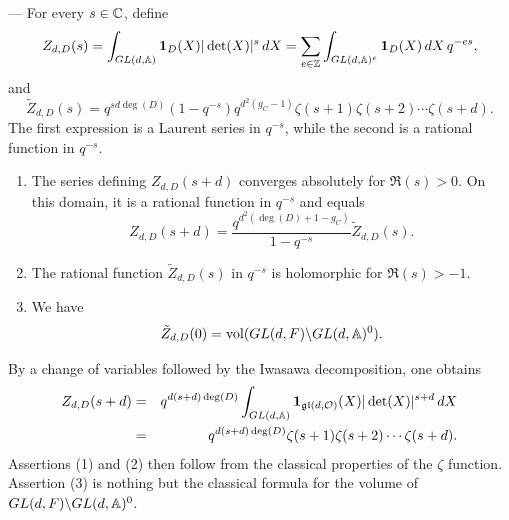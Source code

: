 \begin{paragr} --- For every $s\in \mathbb{C}$, define
$$Z_{d,D}(s)=\int_{GL(d,\mathbb{A})} \mathbf{1}_D(X) |\det(X)|^s\, dX=\sum_{e\in \mathbb{Z}}\int_{GL(d,\mathbb{A})^e} \mathbf{1}_D(X)\, dX \, q^{-es},$$
and
$$\tilde{Z}_{d,D}(s)= q^{sd\deg(D)}(1-q^{-s})q^{d^2(g_C-1)} \zeta(s+1)\zeta(s+2)\cdots \zeta(s+d).$$
The first expression is a Laurent series in $q^{-s}$, while the second is a rational function in $q^{-s}$.

\begin{lemme}\label{lem:zetas}
  \begin{enumerate}
  \item The series defining $Z_{d,D}(s+d)$ converges absolutely for $\Re(s)>0$. On this domain, it is a rational function in $q^{-s}$ and equals
$$ Z_{d,D}(s+d)=\frac{q^{d^2(\deg(D)+1-g_C)}}{1-q^{-s}}\tilde{Z}_{d,D}(s).$$
  \item The rational function $\tilde{Z}_{d,D}(s)$ in $q^{-s}$ is holomorphic for $\Re(s)>-1$.
  \item We have 
$$\tilde{Z}_{d,D}(0)=\operatorname{vol}(GL(d,F)\backslash GL(d,\mathbb{A})^0).$$
  \end{enumerate}
\end{lemme}

\begin{preuve}
By a change of variables followed by the Iwasawa decomposition, one obtains
\begin{eqnarray*}
   Z_{d,D}(s+d)&=&q^{d(s+d)\deg(D)}\int_{GL(d,\mathbb{A})} \mathbf{1}_{\mathfrak{gl}(d,\mathcal{O})}(X) |\det(X)|^{s+d}\, dX\\
&=& q^{d(s+d)\deg(D)}\zeta(s+1)\zeta(s+2)\cdots \zeta(s+d).
\end{eqnarray*}
Assertions (1) and (2) then follow from the classical properties of the $\zeta$ function. Assertion (3) is nothing but the classical formula for the volume of $GL(d,F)\backslash GL(d,\mathbb{A})^0$.
\end{preuve}
\end{paragr}

